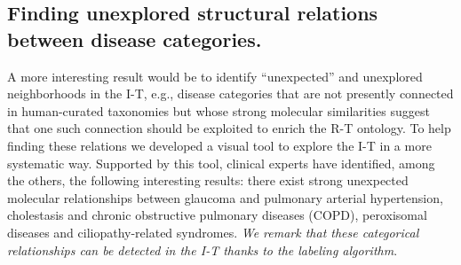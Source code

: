 \documentclass[journal,twoside,web]{ieeecolor}
\begin{document}
\begin{table}[h!]
\centering
{}
\caption{Correspondence among topmost DO categories and the induced taxonomy. 
}
\label{tbl:macro}
\end{table}

\vspace{-15pt}
\subsection{Finding unexplored structural relations between disease categories. }
\label{sec:unexpected}
A more interesting result would be to identify ``unexpected''  and unexplored neighborhoods in the I-T, e.g., disease  categories that are not presently connected in human-curated taxonomies but whose strong molecular similarities suggest that one such connection should be exploited to enrich the R-T ontology. 
To help finding these  relations we developed a visual tool to explore the   I-T in a more systematic way. Supported by this tool, clinical experts have identified, among the others, the following interesting results:
there exist strong unexpected molecular relationships between glaucoma and pulmonary arterial hypertension,
 cholestasis and chronic obstructive pulmonary diseases (COPD), peroxisomal diseases and ciliopathy-related syndromes. \textit{We remark that these categorical relationships can be detected in the I-T thanks to the labeling algorithm}. 
 
\end{document}

